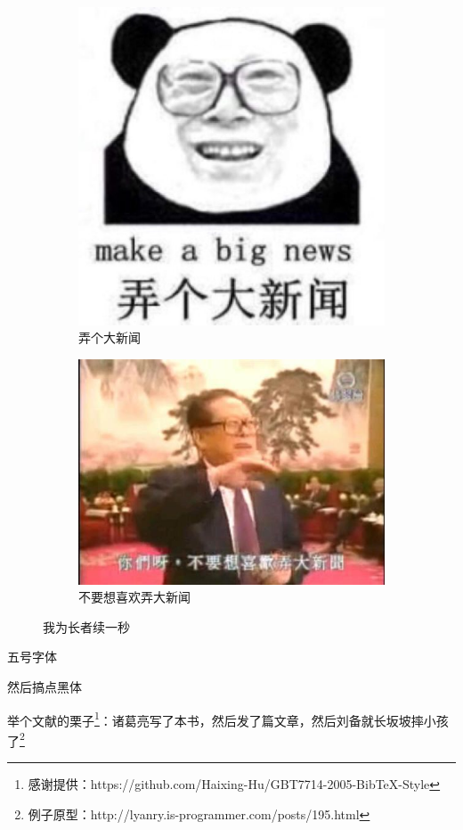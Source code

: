 \begin{figure}[H]
	\centering
	\begin{subfigure}[b]{0.3\textwidth}
		\centering
		\includegraphics[width=.15\textheight]{images/make_a_big_news.jpg}
		\caption{弄个大新闻}
	\end{subfigure}
	\begin{subfigure}[b]{0.3\textwidth}
		\centering
		\includegraphics[width=.15\textheight]{images/you_like_big_news.jpg}
		\caption{不要想喜欢弄大新闻}
	\end{subfigure}
	\caption{我为长者续一秒}
\end{figure}

{\wuhao 五号字体}

{ 然后搞点黑体}

举个文献的栗子\footnote{感谢提供：https://github.com/Haixing-Hu/GBT7714-2005-BibTeX-Style}：诸葛亮写了本书\cite{诸葛亮:Book}，然后发了篇文章\cite{诸葛亮:Article}，然后刘备就长坂坡摔小孩了\cite{刘备:摔小孩}\footnote{例子原型：http://lyanry.is-programmer.com/posts/195.html}
